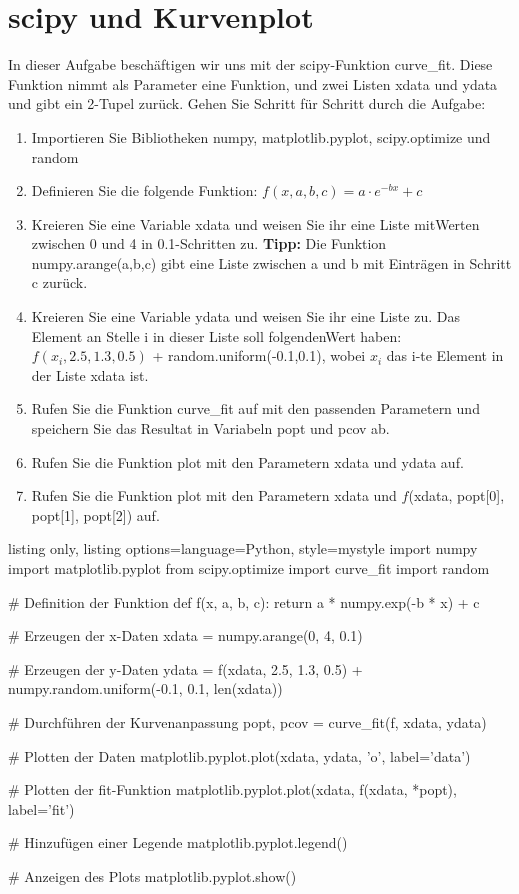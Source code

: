 \documentclass[11pt, oneside]{book}
\begin{document}
\section{scipy und Kurvenplot}
In dieser Aufgabe beschäftigen wir uns mit der scipy-Funktion curve\_fit. Diese Funktion nimmt als Parameter eine Funktion, und zwei Listen xdata und ydata und gibt ein 2-Tupel zur\"uck. Gehen Sie Schritt f\"ur Schritt durch die Aufgabe:
\begin{enumerate}
    \item Importieren Sie Bibliotheken numpy, matplotlib.pyplot, scipy.optimize und random
    \item Definieren Sie die folgende Funktion: $f(x,a,b,c) = a \cdot e^{-bx} + c$
    \item Kreieren Sie eine Variable xdata und weisen Sie ihr eine Liste mitWerten zwischen 0 und 4 in 0.1-Schritten zu. \textbf{Tipp:} Die Funktion numpy.arange(a,b,c) gibt eine Liste zwischen a und b mit Einträgen in Schritt c zur\"uck.
    \item Kreieren Sie eine Variable ydata und weisen Sie ihr eine Liste zu. Das Element an Stelle i in dieser Liste soll folgendenWert haben: $f (x_i ,2.5,1.3,0.5)$ + random.uniform(-0.1,0.1), wobei $x_i$ das i-te Element in der Liste xdata ist.
    \item Rufen Sie die Funktion curve\_fit auf mit den passenden Parametern und speichern Sie das Resultat in Variabeln popt und pcov ab.
    \item Rufen Sie die Funktion plot mit den Parametern xdata und ydata auf.
    \item Rufen Sie die Funktion plot mit den Parametern xdata und $f$(xdata, popt[0], popt[1], popt[2]) auf.
\end{enumerate}

\begin{tcblisting}{listing only, listing options={language=Python, style=mystyle}}
import numpy
import matplotlib.pyplot
from scipy.optimize import curve_fit
import random

# Definition der Funktion
def f(x, a, b, c):
    return a * numpy.exp(-b * x) + c

# Erzeugen der x-Daten
xdata = numpy.arange(0, 4, 0.1)

# Erzeugen der y-Daten
ydata = f(xdata, 2.5, 1.3, 0.5) + numpy.random.uniform(-0.1, 0.1, len(xdata))

# Durchführen der Kurvenanpassung
popt, pcov = curve_fit(f, xdata, ydata)

# Plotten der Daten
matplotlib.pyplot.plot(xdata, ydata, 'o', label='data')

# Plotten der fit-Funktion
matplotlib.pyplot.plot(xdata, f(xdata, *popt), label='fit')

# Hinzufügen einer Legende
matplotlib.pyplot.legend()

# Anzeigen des Plots
matplotlib.pyplot.show()

\end{tcblisting}
\end{document}
